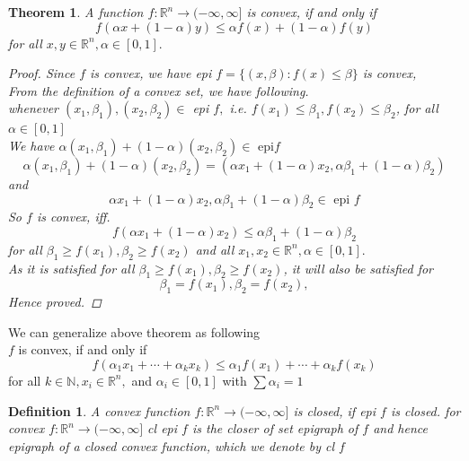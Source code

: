 \documentclass[oneside]{book}
\newtheorem{theorem}{Theorem}[section]
\newtheorem{mydef}{Definition}[section]
\begin{document}
	
	\begin{theorem}
		\label{t:7}
		A function $f: \mathbb{R}^{n} \rightarrow(-\infty, \infty]$ is convex, if and only if
		$$
		f(\alpha x+(1-\alpha) y) \leq \alpha f(x)+(1-\alpha) f(y)
		$$
		for all $x, y \in \mathbb{R}^{n}, \alpha \in[0,1].$
		\begin{proof}
			
			Since $f$ is convex, we have epi $f=\{(x, \beta): f(x) \leq \beta\}$ is convex,\\
			From the definition of a convex set, we have following. \\
			
			whenever $\left(x_{1}, \beta_{1}\right),\left(x_{2}, \beta_{2}\right) \in$ epi $f,$ i.e. $f\left(x_{1}\right) \leq \beta_{1}, f\left(x_{2}\right) \leq \beta_{2}$, for all $\alpha \in[0,1]$ \\
			We have
			$\alpha\left(x_{1}, \beta_{1}\right)+(1-\alpha)\left(x_{2}, \beta_{2}\right) \in \text{ epi} f$
			$$
			\alpha\left(x_{1}, \beta_{1}\right)+(1-\alpha)\left(x_{2}, \beta_{2}\right)=  \left(\alpha x_{1}+(1-\alpha) x_{2}, \alpha \beta_{1}+(1-\alpha) \beta_{2}\right)
			$$
			and  $$ \alpha x_{1}+(1-\alpha) x_{2}, \alpha \beta_{1}+(1-\alpha) \beta_{2} \in \text { epi } f $$
			So $f$ is convex, iff.
			$$
			f\left(\alpha x_{1}+(1-\alpha) x_{2}\right) \leq \alpha \beta_{1}+(1-\alpha) \beta_{2}
			$$
			for   all $ \beta_{1} \geq f\left(x_{1}\right), \beta_{2} \geq f\left(x_{2}\right) $ and  all $ x_{1}, x_{2} \in \mathbb{R}^{n}, \alpha \in[0,1].$ 
			\\
			
			As it is satisfied for all $ \beta_{1} \geq f\left(x_{1}\right), \beta_{2} \geq f\left(x_{2}\right) $, it will also be satisfied for
			$$\beta_{1}=f\left(x_{1}\right), \beta_{2}=f\left(x_{2}\right),$$
			Hence proved.  
		\end{proof}
	\end{theorem} 
	
	We can  generalize above theorem as following \\
	$f$ is convex, if and only if
	\begin{equation}
		\label{eq41}
		f\left(\alpha_{1} x_{1}+\cdots+\alpha_{k} x_{k}\right) \leq \alpha_{1} f\left(x_{1}\right)+\cdots+\alpha_{k} f\left(x_{k}\right)
	\end{equation}
	for all $k \in \mathbb{N}, x_{i} \in \mathbb{R}^{n},$ and $\alpha_{i} \in[0,1]$ with $\sum \alpha_{i}=1$
	
	
	
	\begin{mydef} \label{d:11}
		A convex function $f: \mathbb{R}^{n} \rightarrow(-\infty, \infty]$ is closed, if epi $f$ is closed.
		for convex  $f: \mathbb{R}^{n} \rightarrow(-\infty, \infty]$   cl epi $f$ is the closer of set epigraph of $f$ and hence epigraph of a closed convex function, which we denote by cl $f$
	\end{mydef}
	
\end{document}
